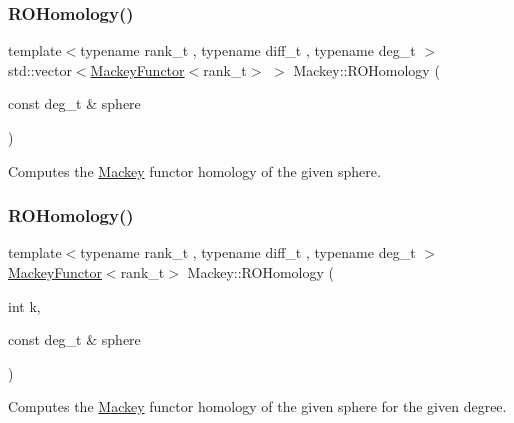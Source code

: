 \subsubsection{\texorpdfstring{R\+O\+Homology()}{ROHomology()}\hspace{0.1cm}{\footnotesize\ttfamily [1/2]}}
{\footnotesize\ttfamily template$<$typename rank\+\_\+t , typename diff\+\_\+t , typename deg\+\_\+t $>$ \\
std\+::vector$<$\hyperlink{classMackey_1_1MackeyFunctor}{Mackey\+Functor}$<$rank\+\_\+t$>$ $>$ Mackey\+::\+R\+O\+Homology (\begin{DoxyParamCaption}\item[{const deg\+\_\+t \&}]{sphere }\end{DoxyParamCaption})}



Computes the \hyperlink{namespaceMackey}{Mackey} functor homology of the given sphere. 

\mbox{\label{namespaceMackey_a5629b0a33e7c2e5c1ae403d8d36044bd}} 
\subsubsection{\texorpdfstring{R\+O\+Homology()}{ROHomology()}\hspace{0.1cm}{\footnotesize\ttfamily [2/2]}}
{\footnotesize\ttfamily template$<$typename rank\+\_\+t , typename diff\+\_\+t , typename deg\+\_\+t $>$ \\
\hyperlink{classMackey_1_1MackeyFunctor}{Mackey\+Functor}$<$rank\+\_\+t$>$ Mackey\+::\+R\+O\+Homology (\begin{DoxyParamCaption}\item[{int}]{k,  }\item[{const deg\+\_\+t \&}]{sphere }\end{DoxyParamCaption})}



Computes the \hyperlink{namespaceMackey}{Mackey} functor homology of the given sphere for the given degree. 

\mbox{\label{namespaceMackey_aa98cd58919c2f716d8df7d61ef1f5c07}} 
